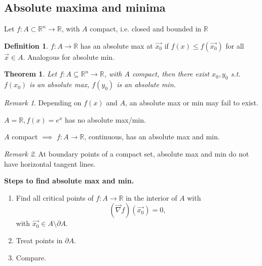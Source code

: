\documentclass[12pt]{book}
\newtheorem{theorem}{Theorem}[section]
\theoremstyle{definition}
\newtheorem{definition}{Definition}[section]
\theoremstyle{remark}
\newtheorem*{remark}{Remark}
\begin{document}
 \subsection{Absolute maxima and minima}%
  \label{sub:Absolute maxima and minima}
   Let $f: A\subset \mathbb{R}^n \to \mathbb{R}$, with $A$ compact, i.e. closed and bounded in $\mathbb{R}$ 
   \begin{definition}$f: A \to \mathbb{R}$ has an absolute max at $\vec{{x_0}}$ if $f(x) \leq f(\vec{{x_0}})$ for all $\vec{{x}} \in A$. Analogous for absolute min.
    
   \end{definition}
\begin{theorem} \label{label}
  Let $f: A\subseteq \mathbb{R}^n \to \mathbb{R}$, with $A$ compact, then there exist $x_0, y_0$ s.t. $f(x_0)$ is an absolute max, $f(y_0)$ is an absolute min.
\end{theorem}
\begin{remark}
  Depending on $f(x)$ and $A$, an absolute max or min may fail to exist.
\end{remark}
\begin{example}
  $A= \mathbb{R}, f(x) = e^x$ has no absolute max/min. 
\end{example}
  \begin{proposition}
    $A$ compact $\implies$ $f:A \rightarrow {\mathbb{R}}$, continuous, has an absolute max and min.
  \end{proposition}
  \begin{remark}
    At boundary points of a compact set, absolute max and min do not have horizontal tangent lines. 
  \end{remark} 
  \begin{proposition}
  \textbf{Steps to find absolute max and min.}
\newline 
  \begin{enumerate}
    \item Find all critical points of $f:A \to \mathbb{R}$ in the interior of $A$ with $$(\vec{{\nabla }} {f})(\vec{{x_0}} ) = 0, $$ with $\vec{{x_0}}\in A\setminus \partial A$.
    \item Treat points in $\partial A$. 
    \item Compare.
  \end{enumerate}
  \end{proposition}
\end{document}
